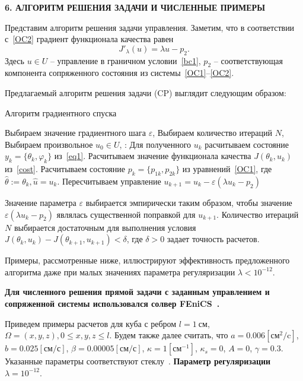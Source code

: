 \begin{center}
    \textbf{6. АЛГОРИТМ РЕШЕНИЯ ЗАДАЧИ И ЧИСЛЕННЫЕ ПРИМЕРЫ}
\end{center}

Представим алгоритм решения задачи управления.
Заметим, что в соответствии с~\eqref{OC2} градиент функционала качества равен
\[
    J'_\lambda (u) = \lambda u - p_2.
\]
Здесь $u\in U$ -- управление в граничном условии~\eqref{bc1}, $p_2$ -- соответствующая компонента
сопряженного состояния из системы~\eqref{OC1}--\eqref{OC2}.

Предлагаемый алгоритм решения задачи (CP) выглядит следующим образом:
\begin{algorithm}[H]
    \caption{Алгоритм градиентного спуска}
    \begin{algorithmic}[1]
        \State Выбираем значение градиентного шага $\varepsilon$,
        \State Выбираем количество итераций $N$,
        \State Выбираем произвольное $u_0 \in U$,
            :
            \State Для полученного $u_k$ расчитываем состояние $y_k = \{\theta_k, \varphi_k\}$ из~\eqref{eq1}.
            \State Расчитываем значение функционала качества $J(\theta_k, u_k)$ из~\eqref{cost}.
            \State Расчитываем состояние $p_k=\{p_{1k},p_{2k}\}$ из уравнений~\eqref{OC1},
            где $ \hat{\theta} := \theta_k, \hat{u}=u_k$.
            \State Пересчитываем управление $u_{k+1} = u_k - \varepsilon (\lambda u_k - p_2)$
        \EndFor
    \end{algorithmic}
\end{algorithm}
Значение параметра $\varepsilon$ выбирается эмпирически таким образом, чтобы значение
$\varepsilon (\lambda u_k - p_2)$ являлась существенной поправкой для $u_{k+1}$.
Количество итераций $N$ выбирается достаточным для выполнения условия
$J(\theta_k, u_k) - J(\theta_{k+1}, u_{k+1}) < \delta$, где $\delta>0$ задает точность расчетов.

Примеры, рассмотренные ниже, иллюстрируют эффективность предложенного алгоритма даже при
малых значениях параметра регуляризации $\lambda < 10^{-12}.$

\textbf{Для численного решения прямой задачи с заданным управлением и сопряженной системы
использовался солвер FEniCS~\cite{fenics, dolfin}.}


Приведем примеры расчетов для куба с ребром $l=1~\text{см}$,
$\Omega = {(x, y, z), 0 \leq x,y,z \leq l}$.
Будем также далее считать, что $a = 0.006[\text{см}^2/\text{c}]$,
$b=0.025[\text{см}/\text{с}]$, $\beta = 0.00005[\text{см}/\text{с}]$,
$\kappa=1[\text{см}^{-1}]$, $\kappa_s = 0$, $A = 0$, $\gamma = 0.3$.
Указанные параметры соответствуют стеклу~\cite{Grenkin5}. \textbf{Параметр регуляризации $\lambda=10^{-12}.$}


